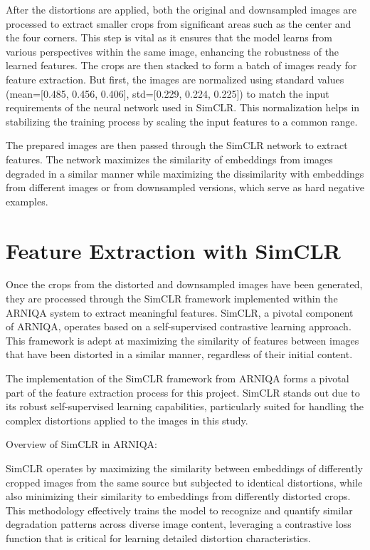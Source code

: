 \noindent
After the distortions are applied, both the original and downsampled images are processed to extract smaller crops from significant areas such as the center and the four corners. This step is vital as it ensures that the model learns from various perspectives within the same image, enhancing the robustness of the learned features. The crops are then stacked to form a batch of images ready for feature extraction. But first, the images are normalized using standard values (mean=[0.485, 0.456, 0.406], std=[0.229, 0.224, 0.225]) to match the input requirements of the neural network used in SimCLR. This normalization helps in stabilizing the training process by scaling the input features to a common range. \par
\vspace{\baselineskip}
\noindent
The prepared images are then passed through the SimCLR network to extract features. The network maximizes the similarity of embeddings from images degraded in a similar manner while maximizing the dissimilarity with embeddings from different images or from downsampled versions, which serve as hard negative examples. \par


\section{Feature Extraction with SimCLR}
\label{sec:FeatureExtraction}
Once the crops from the distorted and downsampled images have been generated, they are processed through the SimCLR framework implemented within the ARNIQA system to extract meaningful features. SimCLR, a pivotal component of ARNIQA, operates based on a self-supervised contrastive learning approach. This framework is adept at maximizing the similarity of features between images that have been distorted in a similar manner, regardless of their initial content. \par


The implementation of the SimCLR framework from ARNIQA forms a pivotal part of the feature extraction process for this project. SimCLR stands out due to its robust self-supervised learning capabilities, particularly suited for handling the complex distortions applied to the images in this study.

Overview of SimCLR in ARNIQA:

SimCLR operates by maximizing the similarity between embeddings of differently cropped images from the same source but subjected to identical distortions, while also minimizing their similarity to embeddings from differently distorted crops. This methodology effectively trains the model to recognize and quantify similar degradation patterns across diverse image content, leveraging a contrastive loss function that is critical for learning detailed distortion characteristics.

